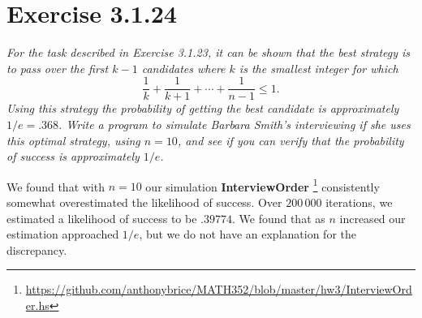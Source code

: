 \documentclass{tufte-handout}
\begin{document}
\section{Exercise 3.1.24}

\emph{For the task described in Exercise 3.1.23, it can be shown that
  the best strategy is to pass over the first $k-1$ candidates where
  $k$ is the smallest integer for which}
\[\frac{1}{k} + \frac{1}{k+1} + \cdots + \frac{1}{n-1} \leq 1.\]
\emph{Using this strategy the probability of getting the best
  candidate is approximately $1/e = .368$. Write a program to simulate
  Barbara Smith's interviewing if she uses this optimal strategy,
  using $n=10$, and see if you can verify that the probability of
  success is approximately $1/e$.}

\bigskip

We found that with $n = 10$ our simulation \textbf{InterviewOrder}%
\footnote{\url{https://github.com/anthonybrice/MATH352/blob/master/hw3/InterviewOrder.hs}}
consistently somewhat overestimated the likelihood of success. Over
$200\,000$ iterations, we estimated a likelihood of success to be
$.39774$. We found that as $n$ increased our estimation approached
$1/e$, but we do not have an explanation for the discrepancy.
\end{document}
